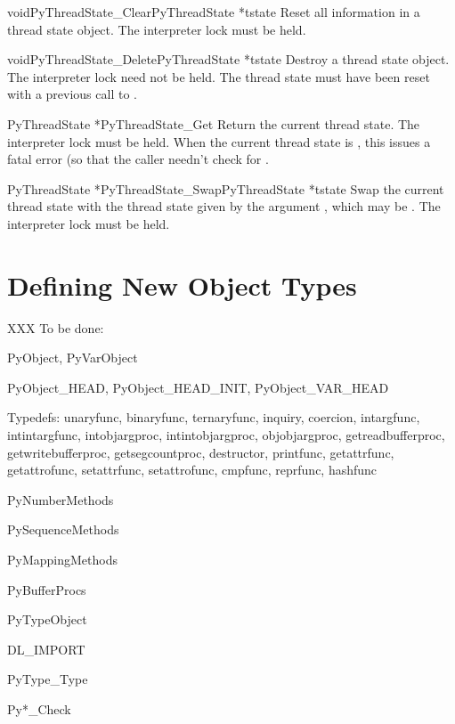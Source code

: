 \begin{cfuncdesc}{void}{PyThreadState_Clear}{PyThreadState *tstate}
Reset all information in a thread state object.  The interpreter lock
must be held.
\end{cfuncdesc}

\begin{cfuncdesc}{void}{PyThreadState_Delete}{PyThreadState *tstate}
Destroy a thread state object.  The interpreter lock need not be
held.  The thread state must have been reset with a previous
call to .
\end{cfuncdesc}

\begin{cfuncdesc}{PyThreadState *}{PyThreadState_Get}{}
Return the current thread state.  The interpreter lock must be held.
When the current thread state is \NULL{}, this issues a fatal
error (so that the caller needn't check for \NULL{}.
\end{cfuncdesc}

\begin{cfuncdesc}{PyThreadState *}{PyThreadState_Swap}{PyThreadState *tstate}
Swap the current thread state with the thread state given by the
argument , which may be \NULL{}.  The interpreter lock
must be held.
\end{cfuncdesc}


\section{Defining New Object Types}

XXX To be done:

PyObject, PyVarObject

PyObject_HEAD, PyObject_HEAD_INIT, PyObject_VAR_HEAD

Typedefs:
unaryfunc, binaryfunc, ternaryfunc, inquiry, coercion, intargfunc,
intintargfunc, intobjargproc, intintobjargproc, objobjargproc,
getreadbufferproc, getwritebufferproc, getsegcountproc,
destructor, printfunc, getattrfunc, getattrofunc, setattrfunc,
setattrofunc, cmpfunc, reprfunc, hashfunc

PyNumberMethods

PySequenceMethods

PyMappingMethods

PyBufferProcs

PyTypeObject

DL_IMPORT

PyType_Type

Py*_Check

